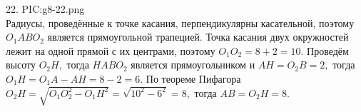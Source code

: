22. {{PIC:g8-22.png}}\\
Радиусы, проведённые к точке касания, перпендикулярны касательной, поэтому $O_1ABO_2$ является прямоугольной трапецией. Точка касания двух окружностей лежит на одной прямой с их центрами, поэтому $O_1O_2=8+2=10.$ Проведём высоту $O_2H,$ тогда $HABO_2$ является прямоугольником и $AH=O_2B=2,$ тогда $O_1H=O_1A-AH=8-2=6.$ По теореме Пифагора $O_2H=\sqrt{O_1O_2^2-O_1H^2}=\sqrt{10^2-6^2}=8,$ тогда $AB=O_2H=8.$\\
